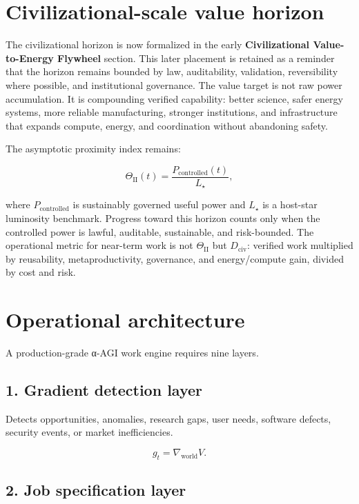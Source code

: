 \documentclass[11pt]{article}
\begin{document}
\section{Civilizational-scale value horizon}\label{civilizational-scale-value-horizon}

The civilizational horizon is now formalized in the early \textbf{Civilizational Value-to-Energy Flywheel} section. This later placement is retained as a reminder that the horizon remains bounded by law, auditability, validation, reversibility where possible, and institutional governance. The value target is not raw power accumulation. It is compounding verified capability: better science, safer energy systems, more reliable manufacturing, stronger institutions, and infrastructure that expands compute, energy, and coordination without abandoning safety.

The asymptotic proximity index remains:

\[
\Theta_{\mathrm{II}}(t)=\frac{P_{\mathrm{controlled}}(t)}{L_{\star}},
\]

where \(P_{\mathrm{controlled}}\) is sustainably governed useful power and \(L_{\star}\) is a host-star luminosity benchmark. Progress toward this horizon counts only when the controlled power is lawful, auditable, sustainable, and risk-bounded. The operational metric for near-term work is not \(\Theta_{\mathrm{II}}\) but \(D_{\mathrm{civ}}\): verified work multiplied by reusability, metaproductivity, governance, and energy/compute gain, divided by cost and risk.

\section{Operational architecture}\label{operational-architecture}

A production-grade α-AGI work engine requires nine layers.

\subsection{1. Gradient detection layer}\label{gradient-detection-layer}

Detects opportunities, anomalies, research gaps, user needs, software defects, security events, or market inefficiencies.

\[
g_t=\nabla_{\text{world}}V.
\]

\subsection{2. Job specification layer}\label{job-specification-layer}
\end{document}
